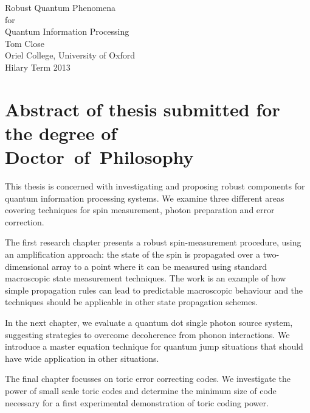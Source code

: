 
\begin{center}

  {\Huge Robust Quantum Phenomena \\[0.5cm] 
               for \\[0.5cm] 
               Quantum Information Processing}\\[1cm]

  {\large Tom Close\\
               Oriel College, University of Oxford\\
               Hilary Term 2013\\[1cm]
  }

\end{center}
 
\section*{Abstract of thesis submitted for the degree of \mbox{Doctor of Philosophy}} 

This thesis is concerned with investigating and proposing robust components for quantum information processing systems. We examine three different areas covering techniques for spin measurement, photon preparation and error correction.

The first research chapter presents a robust spin-measurement procedure, using an amplification approach: the state of the spin is propagated over a two-dimensional array to a point where it can be measured using standard macroscopic state measurement techniques. The work is an example of how simple propagation rules can lead to predictable macroscopic behaviour and the techniques should be applicable in other state propagation schemes. 

In the next chapter, we evaluate a quantum dot single photon source system, suggesting strategies to overcome decoherence from phonon interactions. We introduce a master equation technique for quantum jump situations that should have wide application in other situations.

The final chapter focusses on toric error correcting codes. We investigate the power of small scale toric codes and determine the minimum size of code necessary for a first experimental demonstration of toric coding power.


